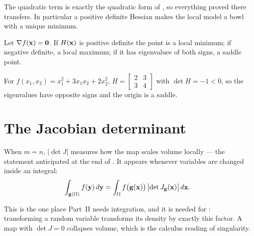 The quadratic term is exactly the quadratic form of , so
everything proved there transfers. In particular a positive definite Hessian
makes the local model a bowl with a unique minimum.

\begin{proposition}
Let \(\nabla f(\mathbf{x})=\mathbf{0}\). If \(H(\mathbf{x})\) is positive definite the
point is a local minimum; if negative definite, a local maximum; if it has
eigenvalues of both signs, a saddle point.
\end{proposition}

\begin{example}
For \(f(x_1,x_2)=x_1^{2}+3x_1x_2+2x_2^{2}\),
\(H=\begin{bmatrix}2&3\\3&4\end{bmatrix}\) with \(\det H=-1<0\), so the
eigenvalues have opposite signs and the origin is a saddle.
\end{example}


\section{The Jacobian determinant}

When \(m=n\), \(|\det J|\) measures how the map scales volume locally --- the
statement anticipated at the end of . It appears whenever
variables are changed inside an integral:
\[
	\int_{\mathbf{g}(\Omega)}f(\mathbf{y})\,d\mathbf{y}
	=\int_{\Omega}f\bigl(\mathbf{g}(\mathbf{x})\bigr)\,\bigl|\det J_{\mathbf{g}}(\mathbf{x})\bigr|\,d\mathbf{x}.
\]

\begin{remark}
This is the one place Part~II needs integration, and it is needed for
: transforming a random variable transforms its density
by exactly this factor. A map with \(\det J=0\) collapses volume, which is the
calculus reading of singularity.
\end{remark}
